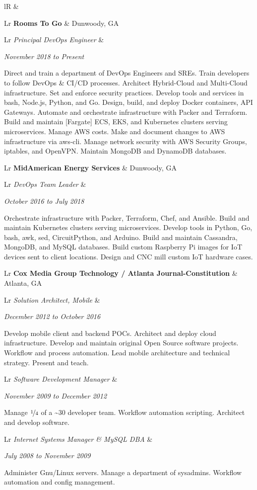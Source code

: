 \documentclass[letterpaper,10pt]{article}
\newcommand{\sizeF}[0]{\fontsize{11pt}{13pt}\selectfont}
\newcounter{skipfirstcounter}
\newcommand{\skipfirst}[1]{
    \ifthenelse{\equal{\value{skipfirstcounter}}{0}}{#1}{#1}
    \addtocounter{skipfirstcounter}{1}
}
\newcommand{\blocktitle}[1]{
    \setcounter{skipfirstcounter}{0}
    \begin{tabularx}{\textwidth}{lR}
        {\sizeF\sc{#1}} & \noindent\hrulefill\\
    \end{tabularx}
}
\newcommand{\blockExperience}[1]{
    \blocktitle{Career}%
    #1%
    \vspace{2mm}%
}
\newcommand{\sectionheaderfirst}[2]{
    \begin{tabularx}{\textwidth}{Lr}%
    \textbf{#1} & #2\\%
    \end{tabularx}%
}
\newcommand{\sectionheader}[2]{
    \vspace{2mm}%
    \sectionheaderfirst{#1}{#2}%
}
\newcommand{\sectionsub}[2]{
    {\def\arraystretch{1}
        \begin{tabularx}{\textwidth}{Lr}
        \rowcolor[rgb]{.9,.9,.9}
        \emph{#1} &
        \rule{0mm}{3.2mm} %
        \emph{#2} \\
        \addlinespace[0.4mm]
        \end{tabularx}
    }
}
\newcommand{\sectionbody}[1]{
    #1
    \vspace{1mm}
}
\begin{document}
\blockExperience{
    \sectionheaderfirst
    {Rooms To Go}{Dunwoody, GA}
    \sectionsub
    {Principal DevOps Engineer}
    {November 2018 to Present}
    \sectionbody{
    Direct and train a department of DevOps Engineers and SREs.
    Train developers to follow DevOps & CI/CD processes.
    Architect Hybrid-Cloud and Multi-Cloud infrastructure.
    Set and enforce security practices.
    Develop tools and services in bash, Node.js, Python, and Go.
    Design, build, and deploy Docker containers, API Gateways.
    Automate and orchestrate infrastructure with Packer and Terraform.
    Build and maintain [Fargate] ECS, EKS, and Kubernetes clusters serving microservices.
    Manage AWS costs.
    Make and document changes to AWS infrastructure via aws-cli.
    Manage network security with AWS Security Groups, iptables, and OpenVPN.
    Maintain MongoDB and DynamoDB databases.
    }

    \sectionheader
    {MidAmerican Energy Services}{Dunwoody, GA}
    \sectionsub
    {DevOps Team Leader}
    {October 2016 to July 2018}
    \sectionbody{
    Orchestrate infrastructure with Packer, Terraform, Chef, and Ansible.
    Build and maintain Kubernetes clusters serving microservices.
    Develop tools in Python, Go, bash, awk, sed, CircuitPython, and Arduino.
    Build and maintain Cassandra, MongoDB, and MySQL databases.
    Build custom Raspberry Pi images for IoT devices sent to client locations.
    Design and CNC mill custom IoT hardware cases.
    }

    \sectionheader
    {Cox Media Group Technology / Atlanta Journal-Constitution}{Atlanta, GA}
    \sectionsub
    {Solution Architect, Mobile}
    {December 2012 to October 2016}
    \sectionbody{
    Develop mobile client and backend POCs.
    Architect and deploy cloud infrastructure.
    Develop and maintain original Open Source software projects.
    Workflow and process automation.
    Lead mobile architecture and technical strategy.
    Present and teach.
    }

    \sectionsub
    {Software Development Manager}
    {November 2009 to December 2012}
    \sectionbody{
    Manage $\nicefrac{1}{4}$ of a \~{}30 developer team.
    Workflow automation scripting.
    Architect and develop software.
    }

    \sectionsub
    {Internet Systems Manager \& MySQL DBA}
    {July 2008 to November 2009}
    \sectionbody{
    Administer Gnu/Linux servers.
    Manage a department of sysadmins.
    Workflow automation and config management.
    }

}
\end{document}
